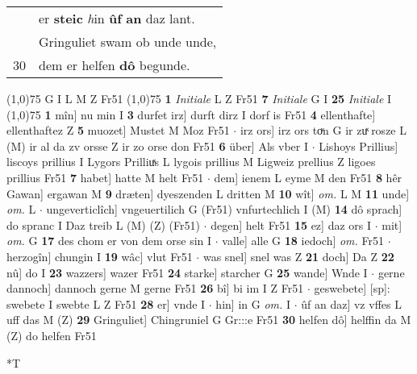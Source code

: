 \documentclass[8pt,a4paper,notitlepage]{article}
\begin{document}
\begin{table}[ht]
\begin{minipage}[t]{0.5\linewidth}
\begin{tabular}{rl}
 & er \textbf{steic} \textit{h}in \textbf{ûf} \textbf{an} daz lant.\\ 
 & Gringuliet swam ob unde unde,\\ 
30 & dem er helfen \textbf{dô} begunde.\\ 
\end{tabular}
\scriptsize
\line(1,0){75} \newline
G I L M Z Fr51 \newline
\line(1,0){75} \newline
\textbf{1} \textit{Initiale} L Z Fr51  \textbf{7} \textit{Initiale} G I  \textbf{25} \textit{Initiale} I  \newline
\line(1,0){75} \newline
\textbf{1} mîn] nu min I \textbf{3} durfet irz] durft dirz I dorf is Fr51 \textbf{4} ellenthafte] ellenthaftez Z \textbf{5} muozet] Mustet M Moz Fr51  $\cdot$ irz ors] irz ors toͮn G ir zuͯ rosze L (M) ir al da zv orsse Z ir zo orse don Fr51 \textbf{6} über] Als vber I  $\cdot$ Lishoys Prillius] liscoys prillius I Lygors Prilliuͯs L lygois prillius M Ligweiz prellius Z ligoes prillius Fr51 \textbf{7} habet] hatte M helt Fr51  $\cdot$ dem] ienem L eyme M den Fr51 \textbf{8} hêr Gawan] ergawan M \textbf{9} dræten] dyeszenden L dritten M \textbf{10} wît] \textit{om.} L M \textbf{11} unde] \textit{om.} L  $\cdot$ ungeverticlîch] vngeuertilich G (Fr51) vnfurtechlich I (M) \textbf{14} dô sprach] do spranc I Daz treib L (M) (Z) (Fr51)  $\cdot$ degen] helt Fr51 \textbf{15} ez] daz ors I  $\cdot$ mit] \textit{om.} G \textbf{17} des chom er von dem orse sin I  $\cdot$ valle] alle G \textbf{18} iedoch] \textit{om.} Fr51  $\cdot$ herzogîn] chungin I \textbf{19} wâc] vlut Fr51  $\cdot$ was snel] snel was Z \textbf{21} doch] Da Z \textbf{22} nû] do I \textbf{23} wazzers] wazer Fr51 \textbf{24} starke] starcher G \textbf{25} wande] Wnde I  $\cdot$ gerne dannoch] dannoch gerne M gerne Fr51 \textbf{26} bî] bi im I Z Fr51  $\cdot$ geswebete] [sp]: swebete I swebte L Z Fr51 \textbf{28} er] vnde I  $\cdot$ hin] in G \textit{om.} I  $\cdot$ ûf an daz] vz vffes L uff das M (Z) \textbf{29} Gringuliet] Chingruniel G Gr:::e Fr51 \textbf{30} helfen dô] helffin da M (Z) do helfen Fr51 \newline
\end{minipage}
\hspace{0.5cm}
\begin{minipage}[t]{0.5\linewidth}
\small
\begin{center}*T
\end{center}
\begin{tabular}{rl}

\end{tabular}
\end{minipage}
\end{table}
\end{document}
